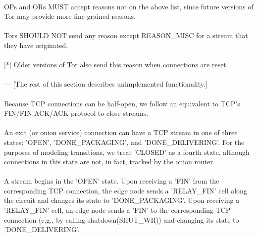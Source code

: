 \paragraph{}
OPs and ORs MUST accept reasons not on the above list, since future
versions of Tor may provide more fine-grained reasons.

\paragraph{}
Tors SHOULD NOT send any reason except REASON\_MISC for a stream that they
have originated.

\paragraph{}
[*] Older versions of Tor also send this reason when connections are
reset.

\paragraph{}
--- [The rest of this section describes unimplemented functionality.]

\paragraph{}
Because TCP connections can be half-open, we follow an equivalent
to TCP's FIN/FIN-ACK/ACK protocol to close streams.

\paragraph{}
An exit (or onion service) connection can have a TCP stream in one of
three states: 'OPEN', 'DONE\_PACKAGING', and 'DONE\_DELIVERING'. For the
purposes of modeling transitions, we treat 'CLOSED' as a fourth state,
although connections in this state are not, in fact, tracked by the
onion router.

\paragraph{}
A stream begins in the 'OPEN' state. Upon receiving a 'FIN' from
the corresponding TCP connection, the edge node sends a 'RELAY\_FIN'
cell along the circuit and changes its state to 'DONE\_PACKAGING'.
Upon receiving a 'RELAY\_FIN' cell, an edge node sends a 'FIN' to
the corresponding TCP connection (e.g., by calling
shutdown(SHUT\_WR)) and changing its state to 'DONE\_DELIVERING'.

